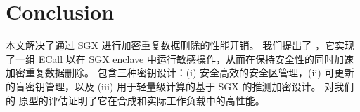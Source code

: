 \section{Conclusion}

本文解决了通过 SGX 进行加密重复数据删除的性能开销。 我们提出了 \sysname，它实现了一组 ECall 以在 SGX enclave 中运行敏感操作，从而在保持安全性的同时加速加密重复数据删除。 \sysname 包含三种密钥设计：(i) 安全高效的安全区管理，(ii) 可更新的盲密钥管理，以及 (iii) 用于轻量级计算的基于 SGX 的推测加密设计。 对我们的 \sysname 原型的评估证明了它在合成和实际工作负载中的高性能。